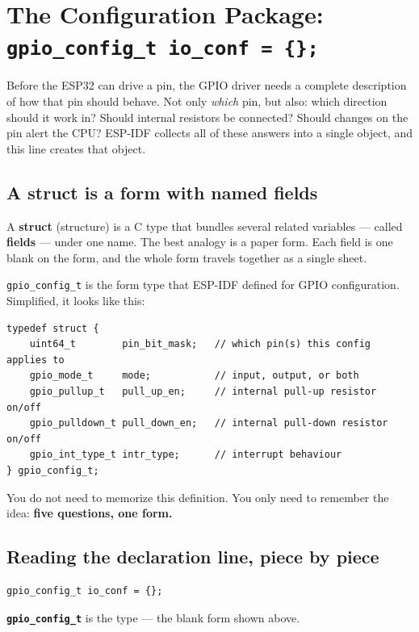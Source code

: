 \documentclass[11pt]{article}
\begin{document}
\section{The Configuration Package: \texttt{gpio\_config\_t io\_conf = \{\};}}

Before the ESP32 can drive a pin, the GPIO driver needs a complete description of how that pin should behave. Not only \emph{which} pin, but also: which direction should it work in? Should internal resistors be connected? Should changes on the pin alert the CPU? ESP-IDF collects all of these answers into a single object, and this line creates that object.

\subsection{A struct is a form with named fields}

A \textbf{struct} (structure) is a C type that bundles several related variables --- called \textbf{fields} --- under one name. The best analogy is a paper form. Each field is one blank on the form, and the whole form travels together as a single sheet.

\texttt{gpio\_config\_t} is the form type that ESP-IDF defined for GPIO configuration. Simplified, it looks like this:

\begin{verbatim}
typedef struct {
    uint64_t        pin_bit_mask;   // which pin(s) this config applies to
    gpio_mode_t     mode;           // input, output, or both
    gpio_pullup_t   pull_up_en;     // internal pull-up resistor on/off
    gpio_pulldown_t pull_down_en;   // internal pull-down resistor on/off
    gpio_int_type_t intr_type;      // interrupt behaviour
} gpio_config_t;
\end{verbatim}

You do not need to memorize this definition. You only need to remember the idea: \textbf{five questions, one form.}

\subsection{Reading the declaration line, piece by piece}

\begin{verbatim}
gpio_config_t io_conf = {};
\end{verbatim}

\textbf{\texttt{gpio\_config\_t}} is the type --- the blank form shown above.
\end{document}
